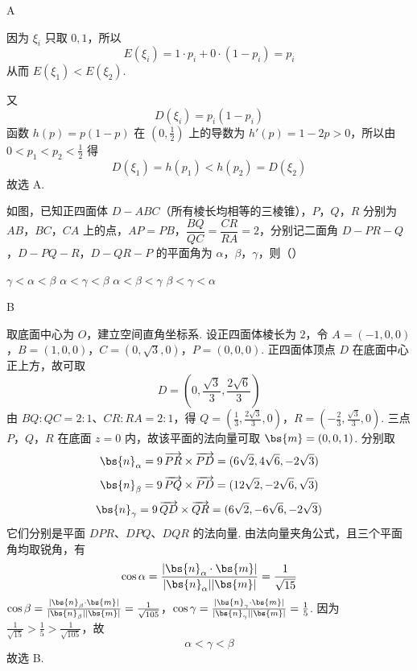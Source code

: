 \begin{answer}
A
\end{answer}

\begin{solution}
因为 \(\xi_i\) 只取 \(0,1\)，所以
\[
E(\xi_i)=1\cdot p_i+0\cdot(1-p_i)=p_i
\]
从而 \(E(\xi_1)<E(\xi_2)\).

又
\[
D(\xi_i)=p_i(1-p_i)
\]
函数 \(h(p)=p(1-p)\) 在 \((0,\frac{1}{2})\) 上的导数为 \(h'(p)=1-2p>0\)，所以由 \(0<p_1<p_2<\frac{1}{2}\) 得
\[
D(\xi_1)=h(p_1)<h(p_2)=D(\xi_2)
\]
故选 A.
\end{solution}

\begin{problem}
如图，已知正四面体 \(D-ABC\)（所有棱长均相等的三棱锥），\(P\)，\(Q\)，\(R\) 分别为 \(AB\)，\(BC\)，\(CA\) 上的点，\(AP=PB\)，\(\dfrac{BQ}{QC}=\dfrac{CR}{RA}=2\)，分别记二面角 \(D-PR-Q\)，\(D-PQ-R\)，\(D-QR-P\) 的平面角为 \(\alpha\)，\(\beta\)，\(\gamma\)，则（\quad）

\begin{center}
\end{center}

\choices
    {\(\gamma<\alpha<\beta\)}
    {\(\alpha<\gamma<\beta\)}
    {\(\alpha<\beta<\gamma\)}
    {\(\beta<\gamma<\alpha\)}
\end{problem}

\begin{answer}
B
\end{answer}

\begin{solution}
取底面中心为 \(O\)，建立空间直角坐标系. 设正四面体棱长为 \(2\)，令
\(A=(-1,0,0)\)，\(B=(1,0,0)\)，\(C=(0,\sqrt{3},0)\)，\(P=(0,0,0)\).
正四面体顶点 \(D\) 在底面中心正上方，故可取
\[
D=\left(0,\frac{\sqrt{3}}{3},\frac{2\sqrt{6}}{3}\right)
\]
由 \(BQ:QC=2:1\)、\(CR:RA=2:1\)，得
\(Q=\left(\frac13,\frac{2\sqrt3}{3},0\right)\)，\(R=\left(-\frac23,\frac{\sqrt3}{3},0\right)\).
三点 \(P\)，\(Q\)，\(R\) 在底面 \(z=0\) 内，故该平面的法向量可取 \(\bs{m}=(0,0,1)\). 分别取
\[
\bs{n}_\alpha=9\,\overrightarrow{PR}\times\overrightarrow{PD}=(6\sqrt2,4\sqrt6,-2\sqrt3)
\]
\[
\bs{n}_\beta=9\,\overrightarrow{PQ}\times\overrightarrow{PD}=(12\sqrt2,-2\sqrt6,\sqrt3)
\]
\[
\bs{n}_\gamma=9\,\overrightarrow{QD}\times\overrightarrow{QR}=(6\sqrt2,-6\sqrt6,-2\sqrt3)
\]
它们分别是平面 \(DPR\)、\(DPQ\)、\(DQR\) 的法向量. 由法向量夹角公式，且三个平面角均取锐角，有
\[
\cos\alpha=\frac{|\bs{n}_\alpha\cdot\bs{m}|}{|\bs{n}_\alpha||\bs{m}|}=\frac{1}{\sqrt{15}}
\]
\(\cos\beta=\frac{|\bs{n}_\beta\cdot\bs{m}|}{|\bs{n}_\beta||\bs{m}|}=\frac{1}{\sqrt{105}}\)，\(\cos\gamma=\frac{|\bs{n}_\gamma\cdot\bs{m}|}{|\bs{n}_\gamma||\bs{m}|}=\frac15\).
因为 \(\frac{1}{\sqrt{15}}>\frac{1}{5}>\frac{1}{\sqrt{105}}\)，故
\[
\alpha<\gamma<\beta
\]
故选 B.
\end{solution}

